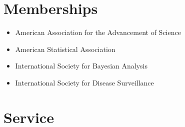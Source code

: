 \documentclass[overlapped,line,letterpaper]{res}
\begin{document}
\begin{resume}

\section{\bf Memberships}
\begin{itemize}
\item American Association for the Advancement of Science
\item American Statistical Association
\item International Society for Bayesian Analysis
\item International Society for Disease Surveillance
\end{itemize}

\section{\bf Service}


\end{resume}
\end{document}
